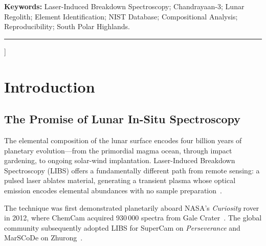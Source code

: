 \documentclass[a4paper,twocolumn,10pt]{article}
\begin{document}
{\begin{@twocolumnfalse}
\begin{abstract}
advanced denoising for bit-exact replicability across research groups.
Beyond infrastructure, LunarAtlas demonstrates \textbf{scientific discovery}:
compositional heterogeneity in lunar south polar highlands that was previously
masked by bulk averaging.
By establishing ``single source of scientific truth'' architecture with
PDS4-aware database schema, adaptive downsampling, and sub-500~ms API response
times, LunarAtlas provides a replicable methodology for Chandrayaan-4,
Artemis-era VIPER, and Commercial Lunar Payload Services (CLPS) LIBS
instruments.
\end{abstract}
\vspace{4pt}
\noindent\textbf{Keywords:} Laser-Induced Breakdown Spectroscopy;
Chandrayaan-3; Lunar Regolith; Element Identification; NIST Database;
Compositional Analysis; Reproducibility; South Polar Highlands.

\vspace{10pt}\hrule\vspace{12pt}
\end{@twocolumnfalse}
}]

\section{Introduction}
\label{sec:intro}

\subsection{The Promise of Lunar In-Situ Spectroscopy}

The elemental composition of the lunar surface encodes four billion years
of planetary evolution---from the primordial magma ocean, through impact
gardening, to ongoing solar-wind implantation. Laser-Induced Breakdown
Spectroscopy (LIBS) offers a fundamentally different path from remote
sensing: a pulsed laser ablates material, generating a transient plasma
whose optical emission encodes elemental abundances with no sample
preparation~\cite{Cremers2006,Wiens2012}.

The technique was first demonstrated planetarily aboard NASA's
\emph{Curiosity} rover in 2012, where ChemCam acquired 930\,000 spectra
from Gale Crater~\cite{Wiens2012,Maurice2012,Gasnault2023}. The global
community subsequently adopted LIBS for SuperCam on \emph{Perseverance}
and MarSCoDe on Zhurong~\cite{Wiens2020,Xu2021}.
\end{document}
